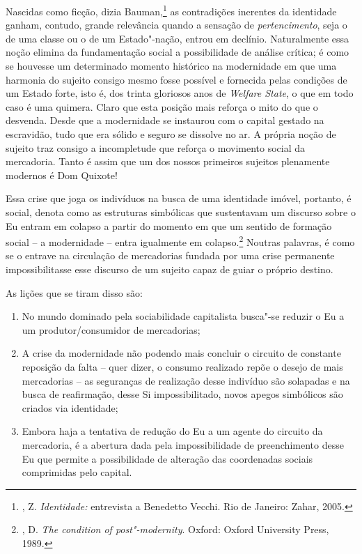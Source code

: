 Nascidas como ficção, dizia Bauman,\footnote{, Z.
  \emph{Identidade:} entrevista a Benedetto Vecchi. Rio de Janeiro:
  Zahar, 2005.} as contradições inerentes da identidade ganham,
contudo, grande relevância quando a sensação de \emph{pertencimento},
seja o de uma classe ou o de um Estado"-nação, entrou em declínio.
Naturalmente essa noção elimina da fundamentação social a possibilidade
de análise crítica; é como se houvesse um determinado momento histórico
na modernidade em que uma harmonia do sujeito consigo mesmo fosse
possível e fornecida pelas condições de um Estado forte, isto é, dos
trinta gloriosos anos de \emph{Welfare State}, o que em todo caso é uma
quimera. Claro que esta posição mais reforça o mito do que o desvenda.
Desde que a modernidade se instaurou com o capital gestado na
escravidão, tudo que era sólido e seguro se dissolve no ar. A própria
noção de sujeito traz consigo a incompletude que reforça o movimento
social da mercadoria. Tanto é assim que um dos nossos primeiros sujeitos
plenamente modernos é Dom Quixote!

Essa crise que joga os indivíduos na busca de uma identidade imóvel,
portanto, é social, denota como as estruturas simbólicas que sustentavam
um discurso sobre o Eu entram em colapso a partir do momento em que um
sentido de formação social -- a modernidade -- entra igualmente em
colapso.\footnote{, D. \emph{The condition of post"-modernity}.
  Oxford: Oxford University Press, 1989.} Noutras palavras, é como se o
entrave na circulação de mercadorias fundada por uma crise permanente
impossibilitasse esse discurso de um sujeito capaz de guiar o próprio
destino.

As lições que se tiram disso são: 

\begin{enumerate}[label=\alph*)]
\item
No mundo dominado pela sociabilidade capitalista busca"-se reduzir o Eu a um produtor/consumidor
de mercadorias; 
\item
A crise da modernidade não podendo mais concluir o circuito de constante reposição da falta -- quer dizer, o consumo
realizado repõe o desejo de mais mercadorias -- as seguranças de
realização desse indivíduo são solapadas e na busca de reafirmação,
desse Si impossibilitado, novos apegos simbólicos são criados via
identidade;
\item
Embora haja a tentativa de redução do Eu a um agente do
circuito da mercadoria, é a abertura dada pela impossibilidade de
preenchimento desse Eu que permite a possibilidade de alteração das
coordenadas sociais comprimidas pelo capital. 
\end{enumerate}

